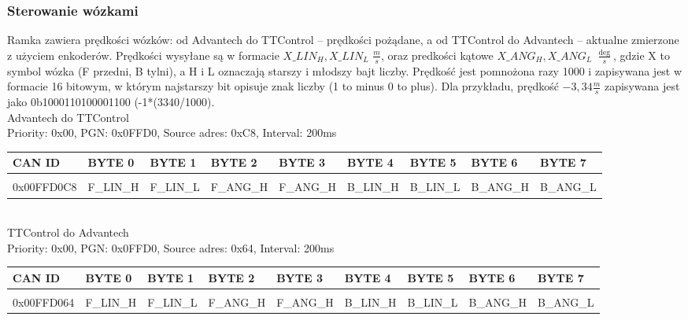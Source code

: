 \documentclass{article}
\begin{document}
\subsubsection{Sterowanie wózkami}
Ramka zawiera prędkości wózków: od Advantech do TTControl -- prędkości pożądane, a od TTControl do Advantech -- aktualne zmierzone z użyciem enkoderów. Prędkości wysyłane są w formacie $X\_LIN_H, X\_LIN_L$ $\frac{m}{s}$, oraz predkości kątowe $X\_ANG_H, X\_ANG_L$ $\frac{\deg}{s}$, gdzie X to symbol wózka (F przedni, B tylni), a H i L oznaczają starszy i młodszy bajt liczby. Prędkość jest pomnożona razy 1000 i zapisywana jest w formacie 16 bitowym, w którym najstarszy bit opisuje znak liczby (1 to minus 0 to plus). Dla przykładu, prędkość $-3,34 \frac{m}{s}$ zapisywana jest jako 0b1000110100001100 (-1*(3340/1000).\\

Advantech do TTControl\\
Priority: 0x00, PGN: 0x0FFD0, Source adres: 0xC8, Interval: 200ms\\
\begin{left}
\begin{tabular}{ |p{2cm}|p{1.5cm}|p{1.5cm}|p{1.5cm}|p{1.5cm}|p{1.5cm}|p{1.5cm}|p{1.5cm}|p{1.5cm}|} 
 \hline
 CAN ID & BYTE 0 & BYTE 1 & BYTE 2 & BYTE 3 & BYTE 4 & BYTE 5 & BYTE 6 & BYTE 7\\ \hline
 & & & & & & & &\\
0x00FFD0C8 & F\_LIN\_H & F\_LIN\_L & F\_ANG\_H & F\_ANG\_H & B\_LIN\_H & B\_LIN\_L & B\_ANG\_H & B\_ANG\_L\\ 
 \hline
\end{tabular}
\end{left}\\

TTControl do Advantech\\
Priority: 0x00, PGN: 0x0FFD0, Source adres: 0x64, Interval: 200ms\\
\begin{left}
\begin{tabular}{ |p{2cm}|p{1.5cm}|p{1.5cm}|p{1.5cm}|p{1.5cm}|p{1.5cm}|p{1.5cm}|p{1.5cm}|p{1.5cm}|} 
 \hline
 CAN ID & BYTE 0 & BYTE 1 & BYTE 2 & BYTE 3 & BYTE 4 & BYTE 5 & BYTE 6 & BYTE 7\\ \hline
 & & & & & & & &\\
0x00FFD064 & F\_LIN\_H & F\_LIN\_L & F\_ANG\_H & F\_ANG\_H & B\_LIN\_H & B\_LIN\_L & B\_ANG\_H & B\_ANG\_L\\ 
 \hline
\end{tabular}
\end{left}\\
\end{document}
